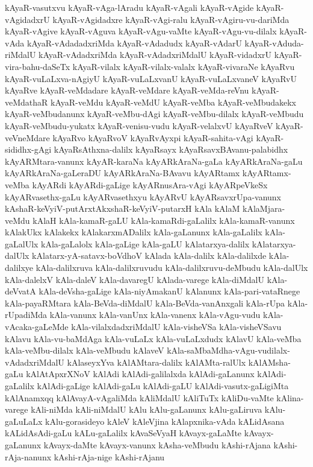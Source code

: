 {kAyaR-vasutxvu
kAyaR-vAga-lAradu
kAyaR-vAgali
kAyaR-vAgide
kAyaR-vAgidadxrU
kAyaR-vAgidadxre
kAyaR-vAgi-ralu
kAyaR-vAgiru-vu-dariMda
kAyaR-vAgive
kAyaR-vAguva
kAyaR-vAgu-vaMte
kAyaR-vAgu-vu-dilalx
kAyaR-vAda
kAyaR-vAdadadxriMda
kAyaR-vAdadudx
kAyaR-vAdarU
kAyaR-vAduda-riMdalU
kAyaR-vAdadxriMda
kAyaR-vAdadxriMdalU
kAyaR-vidadxrU
kAyaR-vira-bahu-daSeTx
kAyaR-vilalx
kAyaR-vilalx-valalx
kAyaR-vivaraNe
kAyaRvu
kAyaR-vuLaLxva-nAgiyU
kAyaR-vuLaLxvanU
kAyaR-vuLaLxvaneV
kAyaRvU
kAyaRve
kAyaR-veMdadare
kAyaR-veMdare
kAyaR-veMda-reVnu
kAyaR-veMdathaR
kAyaR-veMdu
kAyaR-veMdU
kAyaR-veMba
kAyaR-veMbudakekx
kAyaR-veMbudanunx
kAyaR-veMbu-dAgi
kAyaR-veMbu-dilalx
kAyaR-veMbudu
kAyaR-veMbudu-yukatx
kAyaR-venisu-vudu
kAyaR-velalxvU
kAyaRveV
kAyaR-veVneMdare
kAyaRvo
kAyaRvoV
kAyaRvAyxpi
kAyaR-sahita-vAgi
kAyaR-sididhx-gAgi
kAyaRsAthxna-dalilx
kAyaRsayx
kAyaRsavxBAvanu-palabidhx
kAyARMtara-vanunx
kAyAR-karaNa
kAyARkAraNa-gaLa
kAyARkAraNa-gaLu
kAyARkAraNa-gaLeraDU
kAyARkAraNa-BAvavu
kAyARtamx
kAyARtamx-veMba
kAyARdi
kAyARdi-gaLige
kAyARnusAra-vAgi
kAyARpeVkeSx
kAyARvasethx-gaLu
kAyARvasethxyu
kAyARvU
kAyARsavxrUpa-vanunx
kAshaR-keVyiV-putArxtAkxshaR-keVyiV-putarxH
kAla
kAlaM
kAlaMjara-veMdu
kAlaH
kAla-kamaR-gaLU
kAla-kamaRdi-gaLalilx
kAla-kamaR-vanunx
kAlakUkx
kAlakekx
kAlakarxmADalilx
kAla-gaLanunx
kAla-gaLalilx
kAla-gaLalUlx
kAla-gaLalolx
kAla-gaLige
kAla-gaLU
kAlatarxya-dalilx
kAlatarxya-dalUlx
kAlatarx-yA-satavx-boVdhoV
kAlada
kAla-dalilx
kAla-dalilxde
kAla-dalilxye
kAla-dalilxruva
kAla-dalilxruvudu
kAla-dalilxruvu-deMbudu
kAla-dalUlx
kAla-dalelxV
kAla-daleV
kAla-davaregU
kAlada-varege
kAla-diMdalU
kAla-deVvatA
kAla-deVsha-gaLige
kAla-niyAmakanU
kAlanunx
kAla-pari-vataRnege
kAla-payaRMtara
kAla-BeVda-diMdalU
kAla-BeVda-vanAnxgali
kAla-rUpa
kAla-rUpadiMda
kAla-vanunx
kAla-vanUnx
kAla-vanenx
kAla-vAgu-vudu
kAla-vAcaka-gaLeMde
kAla-vilalxdadxriMdalU
kAla-visheVSa
kAla-visheVSavu
kAlavu
kAla-vu-baMdAga
kAla-vuLaLx
kAla-vuLaLxdudx
kAlavU
kAla-veMba
kAla-veMbu-dilalx
kAla-veMbudu
kAlaveV
kAla-saMbaMdha-vAgu-vudilalx-vAdadxriMdalU
kAlaseyxYva
kAlAMtara-dalilx
kAlAMta-ralUlx
kAlAMsha-gaLu
kAlAtApxrXNoV
kAlAdi
kAlAdi-galilalxda
kAlAdi-gaLanunx
kAlAdi-gaLalilx
kAlAdi-gaLige
kAlAdi-gaLu
kAlAdi-gaLU
kAlAdi-vasutx-gaLigiMta
kAlAnamxqq
kAlAvayA-vAgaliMda
kAliMdalU
kAliTuTx
kAliDu-vaMte
kAlina-varege
kAli-niMda
kAli-niMdalU
kAlu
kAlu-gaLanunx
kAlu-gaLiruva
kAlu-gaLuLaLx
kAlu-gorasideyo
kAleV
kAleVjina
kAlapxnika-vAda
kALidAsana
kALidAsAdi-gaLu
kALu-gaLalilx
kAvaSeVyaH
kAvayx-gaLaMte
kAvayx-gaLanunx
kAvayx-daMte
kAvayx-vanunx
kAsha-veMbudu
kAshi-rAjana
kAshi-rAja-nanunx
kAshi-rAja-nige
kAshi-rAjanu
}
